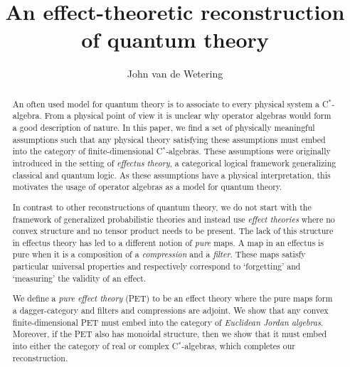 \documentclass[b5paper,onecolumn,12pt,accepted=2019-05-03, issue=1, volume=1, shorttitle=papers/compositionality-1-1]{compositionalityarticle}
\numberwithin{counter}{section}
\begin{document}
\title{An effect-theoretic reconstruction of quantum theory}
\date{}
\author{John van de Wetering}


\maketitle

\begin{abstract}
An often used model for quantum theory is to associate to every physical system a C$^*$-algebra. From a physical point of view it is unclear why operator algebras would form a good description of nature. In this paper, we find a set of physically meaningful assumptions such that any physical theory satisfying these assumptions must embed into the category of finite-dimensional C$^*$-algebras. These assumptions were originally introduced in the setting of \emph{effectus theory}, a categorical logical framework generalizing classical and quantum logic. As these assumptions have a physical interpretation, this motivates the usage of operator algebras as a model for quantum theory.

In contrast to other reconstructions of quantum theory, we do not start with the framework of generalized probabilistic theories and instead use \emph{effect theories} where no convex structure and no tensor product needs to be present. The lack of this structure in effectus theory has led to a different notion of \emph{pure} maps. A map in an effectus is pure when it is a composition of a \emph{compression} and a \emph{filter}. These maps satisfy particular universal properties and respectively correspond to `forgetting' and `measuring' the validity of an effect.

We define a \emph{pure effect theory} (PET) to be an effect theory where the pure maps form a dagger-category and filters and compressions are adjoint. We show that any convex finite-dimensional PET must embed into the category of \emph{Euclidean Jordan algebras}. Moreover, if the PET also has monoidal structure, then we show that it must embed into either the category of real or complex C$^*$-algebras, which completes our reconstruction. 
\end{abstract}
\end{document}
